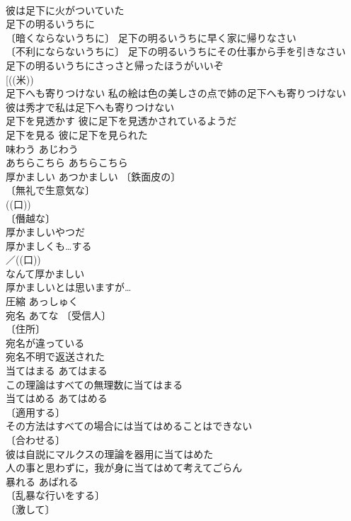 \documentclass[8pt]{extreport}
\begin{document}
\begin{CJK}{UTF8}{min}
\\	彼は足下に火がついていた 
\\	足下の明るいうちに 
\\	〔暗くならないうちに〕 足下の明るいうちに早く家に帰りなさい 
\\	〔不利にならないうちに〕 足下の明るいうちにその仕事から手を引きなさい 
\\	足下の明るいうちにさっさと帰ったほうがいいぞ 
\\	[((米))
\\	足下へも寄りつけない 私の絵は色の美しさの点で姉の足下へも寄りつけない 
\\	彼は秀才で私は足下へも寄りつけない 
\\	足下を見透かす 彼に足下を見透かされているようだ 
\\	足下を見る 彼に足下を見られた 
\\	味わう	あじわう	
\\	あちらこちら	あちらこちら	
\\	厚かましい	あつかましい	〔鉄面皮の〕
\\	〔無礼で生意気な〕
\\	((口)) 
\\	〔僭越な〕
\\	厚かましいやつだ 
\\	厚かましくも…する 
\\	／((口))
\\	なんて厚かましい 
\\	厚かましいとは思いますが… 
\\	圧縮	あっしゅく	
\\	宛名	あてな	〔受信人〕
\\	〔住所〕
\\	宛名が違っている 
\\	宛名不明で返送された 
\\	当てはまる	あてはまる	
\\	この理論はすべての無理数に当てはまる
\\	当てはめる	あてはめる	
\\	〔適用する〕
\\	その方法はすべての場合には当てはめることはできない 
\\	〔合わせる〕
\\	彼は自説にマルクスの理論を器用に当てはめた 
\\	人の事と思わずに，我が身に当てはめて考えてごらん 
\\	暴れる	あばれる	
\\	〔乱暴な行いをする〕
\\	〔激して〕

\end{CJK}
\end{document}
